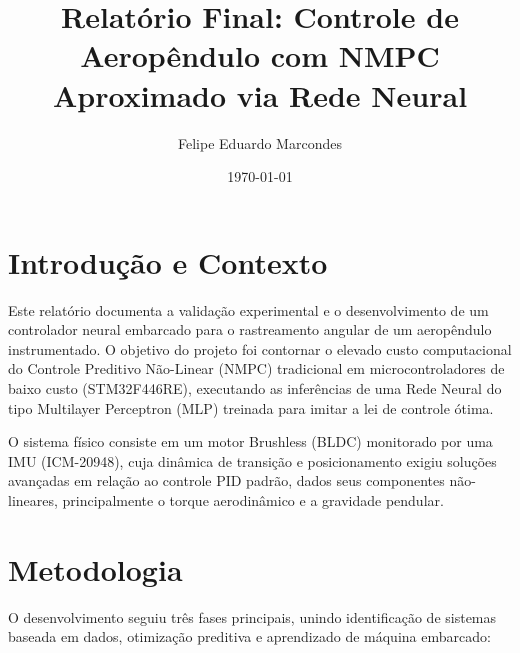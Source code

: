 \documentclass[12pt,a4paper]{article}
\title{\textbf{Relatório Final: Controle de Aeropêndulo com NMPC Aproximado via Rede Neural}}
\author{Felipe Eduardo Marcondes}
\date{\today}
\begin{document}
\maketitle

\section{Introdução e Contexto}

Este relatório documenta a validação experimental e o desenvolvimento de um controlador neural embarcado para o rastreamento angular de um aeropêndulo instrumentado. O objetivo do projeto foi contornar o elevado custo computacional do Controle Preditivo Não-Linear (NMPC) tradicional em microcontroladores de baixo custo (STM32F446RE), executando as inferências de uma Rede Neural do tipo Multilayer Perceptron (MLP) treinada para imitar a lei de controle ótima. 

O sistema físico consiste em um motor Brushless (BLDC) monitorado por uma IMU (ICM-20948), cuja dinâmica de transição e posicionamento exigiu soluções avançadas em relação ao controle PID padrão, dados seus componentes não-lineares, principalmente o torque aerodinâmico e a gravidade pendular.

\section{Metodologia}

O desenvolvimento seguiu três fases principais, unindo identificação de sistemas baseada em dados, otimização preditiva e aprendizado de máquina embarcado:
\end{document}
